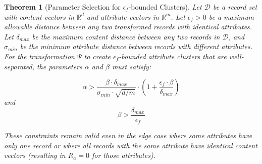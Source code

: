 \documentclass[numbers,sort]{article}
\newtheorem{theorem}{Theorem}
\begin{document}
\begin{theorem}[Parameter Selection for $\epsilon_f$-bounded Clusters]
\label{theo:parameters}
Let $\mathcal{D}$ be a record set with content vectors in $\mathbb{R}^d$ and attribute vectors in $\mathbb{R}^m$. Let $\epsilon_f > 0$ be a maximum allowable distance between any two transformed records with identical attributes. Let $\delta_{max}$ be the maximum content distance between any two records in $\mathcal{D}$, and $\sigma_{min}$ be the minimum attribute distance between records with different attributes. For the transformation $\Psi$ to create $\epsilon_f$-bounded attribute clusters that are well-separated, the parameters $\alpha$ and $\beta$ must satisfy:

\begin{equation}
\alpha > \frac{\beta \cdot \delta_{max}}{\sigma_{min} \cdot \sqrt{d/m}} \cdot \left(1 + \frac{\epsilon_f \cdot \beta}{\delta_{max}}\right)
\end{equation}
and
\begin{equation}
\beta > \frac{\delta_{max}}{\epsilon_f}
\end{equation}

These constraints remain valid even in the edge case where some attributes have only one record or where all records with the same attribute have identical content vectors (resulting in $R_a = 0$ for those attributes).
\end{theorem}
\end{document}
